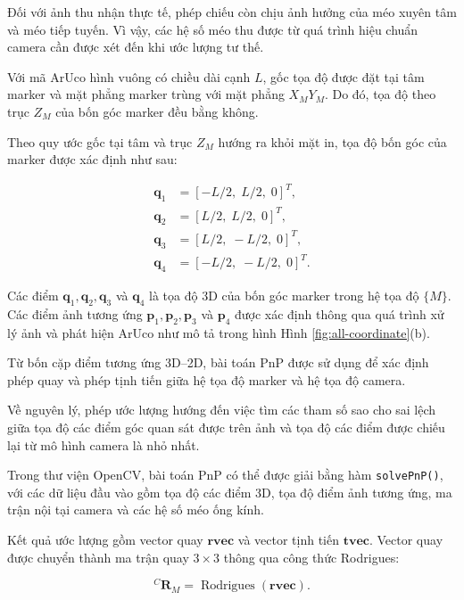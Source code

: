 Đối với ảnh thu nhận thực tế, phép chiếu còn chịu
ảnh hưởng của méo xuyên tâm và méo tiếp tuyến.
Vì vậy, các hệ số méo thu được từ quá trình hiệu
chuẩn camera cần được xét đến khi ước lượng tư thế.

Với mã ArUco hình vuông có chiều dài cạnh $L$,
gốc tọa độ được đặt tại tâm marker và mặt phẳng
marker trùng với mặt phẳng $X_MY_M$. Do đó,
tọa độ theo trục $Z_M$ của bốn góc marker đều
bằng không.

Theo quy ước gốc tại tâm và trục $Z_M$ hướng
ra khỏi mặt in, tọa độ bốn góc của marker được
xác định như sau:

\begin{equation}
\begin{aligned}
    \mathbf{q}_1 &=
    [-L/2,\; L/2,\; 0]^T,\\
    \mathbf{q}_2 &=
    [ L/2,\; L/2,\; 0]^T,\\
    \mathbf{q}_3 &=
    [ L/2,\;-L/2,\; 0]^T,\\
    \mathbf{q}_4 &=
    [-L/2,\;-L/2,\; 0]^T.
\end{aligned}
\label{eq:marker_corners}
\end{equation}

Các điểm $\mathbf{q}_1,\mathbf{q}_2,\mathbf{q}_3$
và $\mathbf{q}_4$ là tọa độ 3D của bốn góc marker
trong hệ tọa độ $\{M\}$. Các điểm ảnh tương ứng
$\mathbf{p}_1,\mathbf{p}_2,\mathbf{p}_3$ và
$\mathbf{p}_4$ được xác định thông qua quá trình
xử lý ảnh và phát hiện ArUco như mô tả trong hình Hình \ref{fig:all-coordinate}(b).

Từ bốn cặp điểm tương ứng 3D--2D, bài toán PnP
được sử dụng để xác định phép quay và phép tịnh tiến
giữa hệ tọa độ marker và hệ tọa độ camera.

Về nguyên lý, phép ước lượng hướng đến việc tìm
các tham số sao cho sai lệch giữa tọa độ các điểm
góc quan sát được trên ảnh và tọa độ các điểm
được chiếu lại từ mô hình camera là nhỏ nhất.

Trong thư viện OpenCV, bài toán PnP có thể được
giải bằng hàm \texttt{solvePnP()}, với các dữ liệu
đầu vào gồm tọa độ các điểm 3D, tọa độ điểm ảnh
tương ứng, ma trận nội tại camera và các hệ số
méo ống kính.

Kết quả ước lượng gồm vector quay
$\mathbf{rvec}$ và vector tịnh tiến
$\mathbf{tvec}$. Vector quay được chuyển thành
ma trận quay $3\times3$ thông qua công thức
Rodrigues:

\begin{equation}
    {}^{C}\mathbf{R}_{M}
    =
    \operatorname{Rodrigues}(\mathbf{rvec}).
    \label{eq:pnp_rodrigues}
\end{equation}

